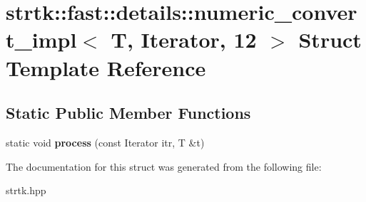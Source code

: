 \hypertarget{structstrtk_1_1fast_1_1details_1_1numeric__convert__impl_3_01T_00_01Iterator_00_0112_01_4}{\section{strtk\-:\-:fast\-:\-:details\-:\-:numeric\-\_\-convert\-\_\-impl$<$ T, Iterator, 12 $>$ Struct Template Reference}
\label{structstrtk_1_1fast_1_1details_1_1numeric__convert__impl_3_01T_00_01Iterator_00_0112_01_4}
}
\subsection*{Static Public Member Functions}
\begin{DoxyCompactItemize}
\item 
\hypertarget{structstrtk_1_1fast_1_1details_1_1numeric__convert__impl_3_01T_00_01Iterator_00_0112_01_4_a76a24de61dd411dc9e48f456140e2eb6}{static void {\bfseries process} (const Iterator itr, T \&t)}\label{structstrtk_1_1fast_1_1details_1_1numeric__convert__impl_3_01T_00_01Iterator_00_0112_01_4_a76a24de61dd411dc9e48f456140e2eb6}

\end{DoxyCompactItemize}


The documentation for this struct was generated from the following file\-:\begin{DoxyCompactItemize}
\item 
strtk.\-hpp\end{DoxyCompactItemize}
